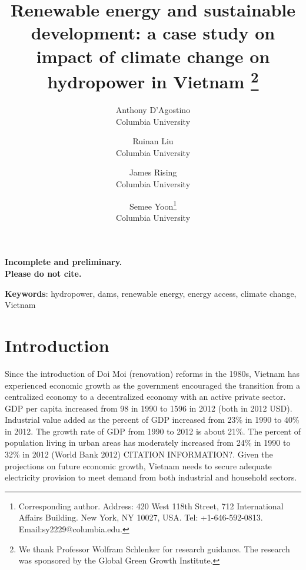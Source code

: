 \documentclass[11pt,english]{article}
\theoremstyle{plain} \newtheorem{claim}{Claim}
\theoremstyle{plain} \newtheorem{prop}{Proposition}
\theoremstyle{plain} \newtheorem{hypo}{Hypothesis}
\begin{document}
\title{Renewable energy and sustainable development: a case study on impact of climate change on hydropower in Vietnam \thanks{We thank Professor Wolfram Schlenker for research guidance. The research was sponsored by the Global Green Growth Institute.}}

\author{Anthony D'Agostino\\Columbia University \and Ruinan Liu\\Columbia University \and James Rising\\Columbia University \and Semee Yoon\footnote{Corresponding author. Address: 420 West 118th Street, 712 International Affairs Building. New York, NY 10027, USA. Tel: +1-646-592-0813. Email:sy2229@columbia.edu.}\\Columbia University }

\maketitle

\begin{center}
\textbf{Incomplete and preliminary. \\
Please do not cite. }
\end{center}



\textbf{Keywords}: hydropower, dams, renewable energy, energy access, climate change, Vietnam

\clearpage

\section{Introduction}

	Since the introduction of Doi Moi (renovation) reforms in the 1980s, Vietnam has experienced economic growth as the government encouraged the transition from a centralized economy to a decentralized economy with an active private sector. GDP per capita increased from  98 in 1990 to  1596 in 2012 (both in 2012 USD). Industrial value added as the percent of GDP increased from 23\% in 1990 to 40\% in 2012. The growth rate of GDP from 1990 to 2012 is about 21\%. The percent of population living in urban areas has moderately increased from 24\% in 1990 to 32\% in 2012 (World Bank 2012) CITATION INFORMATION?. Given the projections on future economic growth, Vietnam needs to secure adequate electricity provision to meet demand from both industrial and household sectors. 
\end{document}
